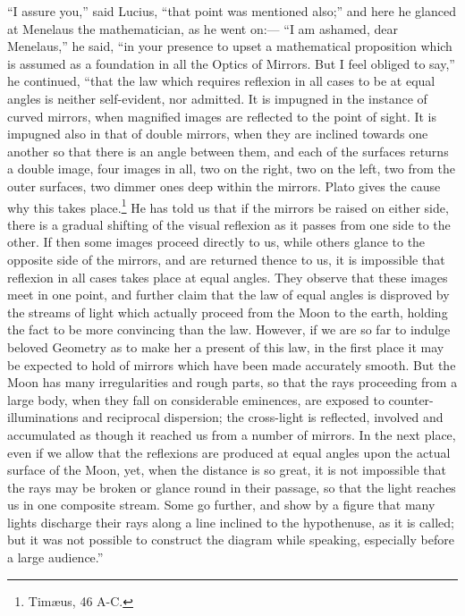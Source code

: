 \documentclass[a4paper, 11pt, oneside, polutonikogreek, english]{article}
\begin{document}
``I assure you,'' said Lucius, ``that point was mentioned also;'' and here he glanced at Menelaus the mathematician, as he went on:--- ``I am ashamed, dear Menelaus,'' he said, ``in your presence to upset a mathematical proposition which is assumed as a foundation in all the Optics of Mirrors. But I feel obliged to say,'' he continued, ``that the law which requires reflexion in all cases to be at equal angles is neither self-evident, nor admitted. It is impugned in the instance of curved mirrors, when magnified images are reflected to the point of sight. It is impugned also in that of double mirrors, when they are inclined towards one another so that there is an angle between them, and each of the surfaces returns a double image, four images in all, two on the right, two on the left, two from the outer surfaces, two dimmer ones deep within the mirrors. Plato gives the cause why this takes place.\footnote{Timæus, 46 A-C.} He has told us that if the mirrors be raised on either side, there is a gradual shifting of the visual reflexion as it passes from one side to the other. If then some images proceed directly to us, while others glance to the opposite side of the mirrors, and are returned thence to us, it is impossible that reflexion in all cases takes place at equal angles. They observe that these images meet in one point, and further claim that the law of equal angles is disproved by the streams of light which actually proceed from the Moon to the earth, holding the fact to be more convincing than the law. However, if we are so far to indulge beloved Geometry as to make her a present of this law, in the first place it may be expected to hold of mirrors which have been made accurately smooth. But the Moon has many irregularities and rough parts, so that the rays proceeding from a large body, when they fall on considerable eminences, are exposed to counter-illuminations and reciprocal dispersion; the cross-light is reflected, involved and accumulated as though it reached us from a number of mirrors. In the next place, even if we allow that the reflexions are produced at equal angles upon the actual surface of the Moon, yet, when the distance is so great, it is not impossible that the rays may be broken or glance round in their passage, so that the light reaches us in one composite stream. Some go further, and show by a figure that many lights discharge their rays along a line inclined to the hypothenuse, as it is called; but it was not possible to construct the diagram while speaking, especially before a large audience.''
\end{document}
